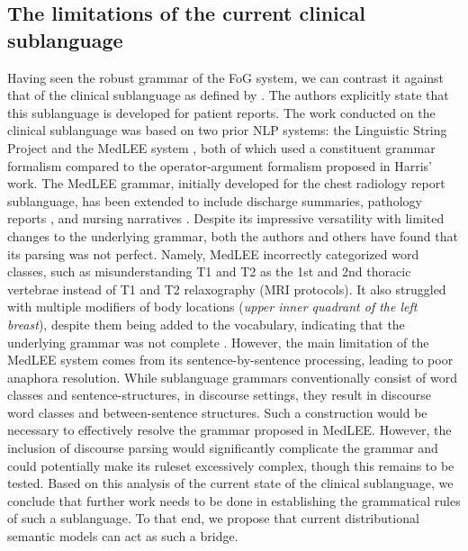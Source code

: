 \subsection{The limitations of the current clinical sublanguage}
Having seen the robust grammar of the FoG system, we can contrast it against that of the clinical sublanguage as defined by \citet{friedmanTwoBiomedicalSublanguages2002}. The authors explicitly state that this sublanguage is developed for patient reports. The work conducted on the clinical sublanguage was based on two prior NLP systems: the Linguistic String Project \cite{sagerNaturalLanguageProcessing1994} and the MedLEE system \cite{friedmanGeneralNaturallanguageText1994}, both of which used a constituent grammar formalism compared to the operator-argument formalism proposed in Harris' work. The MedLEE grammar, initially developed for the chest radiology report sublanguage, has been extended to include discharge summaries, pathology reports \cite{friedmanBroadcoverageNaturalLanguage2000}, and nursing narratives \citep{hyunExploringAbilityNatural2009}. Despite its impressive versatility with limited changes to the underlying grammar, both the authors \cite{lussierAutomatingSNOMEDCoding2001} and others \cite{sevensterAutomaticallyCorrelatingClinical2012} have found that its parsing was not perfect. Namely, MedLEE incorrectly categorized word classes, such as misunderstanding T1 and T2 as the 1st and 2nd thoracic vertebrae instead of T1 and T2 relaxography (MRI protocols). It also struggled with multiple modifiers of body locations (\emph{upper inner quadrant of the left breast}), despite them being added to the vocabulary, indicating that the underlying grammar was not complete \cite{lussierAutomatingSNOMEDCoding2001, jainIdentificationSuspectedTuberculosis1996}. However, the main limitation of the MedLEE system comes from its sentence-by-sentence processing, leading to poor anaphora resolution. While sublanguage grammars conventionally consist of word classes and sentence-structures, in discourse settings, they result in discourse word classes and between-sentence structures. Such a construction would be necessary to effectively resolve the grammar proposed in MedLEE. However, the inclusion of discourse parsing would significantly complicate the grammar and could potentially make its ruleset excessively complex, though this remains to be tested. Based on this analysis of the current state of the clinical sublanguage, we conclude that further work needs to be done in establishing the grammatical rules of such a sublanguage. To that end, we propose that current distributional semantic models can act as such a bridge.


